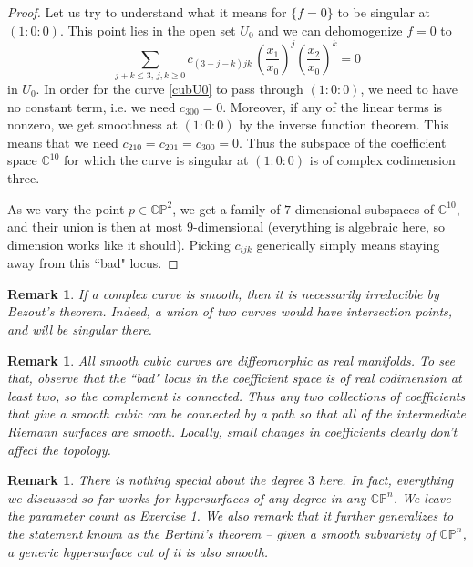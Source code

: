 \documentclass[11pt]{article}
\numberwithin{equation}{section}
\numberwithin{footnote}{section}
\newtheorem{rem}[thm]{Remark}
\newcommand{\blue}{\color{blue}}
\renewcommand{\P}{{\mathbb P}}
\newcommand{\C}{{\mathbb C}}
\begin{document}
\begin{proof}
Let us try to understand what it means for $\{f=0\}$ to be singular at $(1:0:0)$. This point lies in the open set $U_0$ and we can dehomogenize $f=0$ to 
\begin{equation}\label{cubU0}
\sum_{j+k\leq 3,\,j,k\geq 0}c_{(3-j-k)jk} \,\left(\frac {x_1}{x_0}\right)^j \left(\frac {x_2}{x_0}\right)^k = 0
\end{equation}
in $U_0$. In order for the curve \eqref{cubU0} to pass through $(1:0:0)$, we need to have no constant term, i.e. we need $c_{300}=0$. Moreover, if any of the linear terms is nonzero, we get smoothness at $(1:0:0)$ by the inverse function theorem. This means that we need $c_{210}=c_{201}=c_{300}=0$. Thus the subspace of the coefficient space $\C^{10}$ for which  the curve is singular at $(1:0:0)$ is of complex codimension three. 

As we vary the point $p\in \C\P^2$, we get a family of $7$-dimensional subspaces of  $\C^{10}$, and their union is then at most $9$-dimensional (everything is algebraic here, so dimension works like it should). Picking $c_{ijk}$ generically simply means staying away from this ``bad" locus.
\end{proof}

\smallskip
\begin{rem}
If a complex curve is smooth, then it is necessarily irreducible by Bezout's theorem. Indeed, a union of two curves would have intersection points, and will be singular there.
\end{rem}

\smallskip
\begin{rem}
All smooth cubic curves are diffeomorphic {\blue as real manifolds}. To see that, observe that the ``bad" locus in the coefficient space is of real codimension at least two, so the complement is connected. Thus any two collections of coefficients that give a smooth cubic can be connected by a path so that all of the intermediate Riemann surfaces are smooth. Locally, small changes in coefficients clearly don't affect the topology. 
\end{rem}

\smallskip
\begin{rem}
There is nothing special about the degree $3$ here. In fact, everything we discussed so far works for hypersurfaces of any degree in any $\C\P^n$. We leave the parameter count as Exercise 1. We also remark that it further generalizes to the statement known as the Bertini's theorem -- given a smooth subvariety of $\C\P^n$, a generic hypersurface cut of it is also smooth.
\end{rem}
\end{document}

